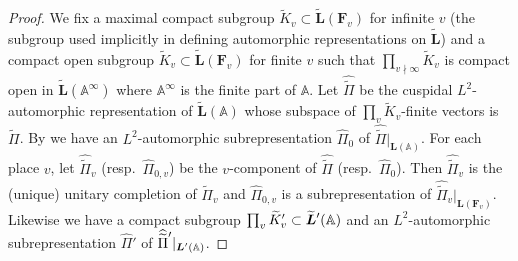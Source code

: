\documentclass[a4paper]{amsart}
\numberwithin{equation}{section}
\theoremstyle{remark}
\theoremstyle{definition}
\newcommand{\glob}[1]{\boldsymbol{#1}}
\newcommand{\lowprime}[1][\prime]{
  \mathchoice
    {\raisebox{-0.7ex}{$\scriptstyle #1$}}
    {\raisebox{-0.7ex}{$\scriptstyle #1$}}
    {\raisebox{-0.7ex}{$\scriptstyle #1$}}
    {\raisebox{-0.3ex}{$\scriptscriptstyle #1$}}
}
\begin{document}
\begin{proof}
We fix a maximal compact subgroup $\widetilde{K}_{v}\subset\widetilde{\glob{L}}(\glob{F}_{v})$ for infinite $v$ (the subgroup used implicitly in defining automorphic representations on $\widetilde{\glob{L}}$) and a compact open subgroup $\widetilde{K}_{v}\subset\widetilde{\glob{L}}(\glob{F}_{v})$ for finite $v$ such that $\prod_{v \nmid \infty} \widetilde{K}_{v}$ is compact open in $\widetilde{\glob{L}}(\mathbb{A}^\infty)$ where $\mathbb{A}^{\infty}$ is the finite part of $\mathbb{A}$.
Let $\widehat{\widetilde{\Pi}}$ be the cuspidal $L^{2}$-automorphic representation of $\widetilde{\glob{L}}(\mathbb{A})$ whose subspace of $\prod_{v}\widetilde{K}_{v}$-finite vectors is $\widetilde{\Pi}$.
By \cite[Theorem~1.1]{MR3996349} we have an $L^{2}$-automorphic subrepresentation $\widehat{\Pi}_{0}$ of $\widehat{\widetilde{\Pi}}|_{\glob{L}(\mathbb{A})}$.
For each place $v$, let $\widehat{\widetilde{\Pi}}_{v}$ (resp.\ $\widehat{\Pi}_{0,v}$) be the $v$-component of $\widehat{\widetilde{\Pi}}$ (resp.\ $\widehat{\Pi}_{0}$).
Then $\widehat{\widetilde{\Pi}}_v$ is the (unique) unitary completion of $\widetilde{\Pi}_v$ and $\widehat{\Pi}_{0,v}$ is a subrepresentation of $\widehat{\widetilde{\Pi}}_v|_{\glob{L}(\glob{F}_{v})}$.
Likewise we have a compact subgroup $\prod_v \widetilde{K}'_{v}\subset\widetilde{\glob{L}}^{\lowprime}(\mathbb{A})$ and an $L^{2}$-automorphic subrepresentation $\widehat{\Pi}'$ of $\widehat{\widetilde{\Pi}}^{\lowprime}|_{\glob{L}'(\mathbb{A})}$.


\end{proof}
\end{document}
